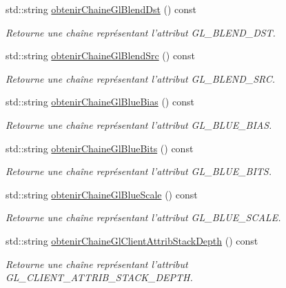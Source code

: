 \begin{DoxyCompactItemize}
std\-::string \hyperlink{group__utilitaire_gaa52ab39bcb62d4f8777afddfca458650}{obtenir\-Chaine\-Gl\-Blend\-Dst} () const 
\begin{DoxyCompactList}\small\item\em Retourne une chaîne représentant l'attribut G\-L\-\_\-\-B\-L\-E\-N\-D\-\_\-\-D\-S\-T. \end{DoxyCompactList}\item 
std\-::string \hyperlink{group__utilitaire_ga510a36fe5d3e313756e40b5c67b516ba}{obtenir\-Chaine\-Gl\-Blend\-Src} () const 
\begin{DoxyCompactList}\small\item\em Retourne une chaîne représentant l'attribut G\-L\-\_\-\-B\-L\-E\-N\-D\-\_\-\-S\-R\-C. \end{DoxyCompactList}\item 
std\-::string \hyperlink{group__utilitaire_ga95f9a6baabd65a0cdd4b1e5cbeb4f678}{obtenir\-Chaine\-Gl\-Blue\-Bias} () const 
\begin{DoxyCompactList}\small\item\em Retourne une chaîne représentant l'attribut G\-L\-\_\-\-B\-L\-U\-E\-\_\-\-B\-I\-A\-S. \end{DoxyCompactList}\item 
std\-::string \hyperlink{group__utilitaire_ga125172f1c5c4ef27c20c4e52a70ce38a}{obtenir\-Chaine\-Gl\-Blue\-Bits} () const 
\begin{DoxyCompactList}\small\item\em Retourne une chaîne représentant l'attribut G\-L\-\_\-\-B\-L\-U\-E\-\_\-\-B\-I\-T\-S. \end{DoxyCompactList}\item 
std\-::string \hyperlink{group__utilitaire_ga8422f585aba4fc07dcaac22e6cf587b3}{obtenir\-Chaine\-Gl\-Blue\-Scale} () const 
\begin{DoxyCompactList}\small\item\em Retourne une chaîne représentant l'attribut G\-L\-\_\-\-B\-L\-U\-E\-\_\-\-S\-C\-A\-L\-E. \end{DoxyCompactList}\item 
std\-::string \hyperlink{group__utilitaire_gad57f6d8da9cffeae2204a77e6e5f9292}{obtenir\-Chaine\-Gl\-Client\-Attrib\-Stack\-Depth} () const 
\begin{DoxyCompactList}\small\item\em Retourne une chaîne représentant l'attribut G\-L\-\_\-\-C\-L\-I\-E\-N\-T\-\_\-\-A\-T\-T\-R\-I\-B\-\_\-\-S\-T\-A\-C\-K\-\_\-\-D\-E\-P\-T\-H. \end{DoxyCompactList}\item 

\end{DoxyCompactItemize}
